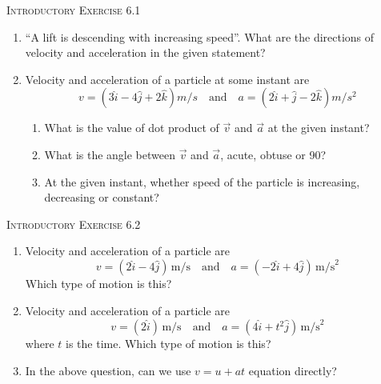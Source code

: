 \documentclass{article}
\begin{document}
\begin{center}
    \textsc{Introductory Exercise 6.1}
\end{center}
\begin{enumerate}
    \item “A lift is descending with increasing speed”. What are the directions of velocity and acceleration in the given statement?
    \item Velocity and acceleration of a particle at some instant are
    \[ v = (3\hat{i} - 4\hat{j} + 2\hat{k}) m/s \quad \text{and} \quad a = (2\hat{i} + \hat{j} - 2\hat{k}) m/s^2 \]
    \begin{enumerate}
        \item What is the value of dot product of $\vec{v}$ and $\vec{a}$ at the given instant?
        \item What is the angle between $\vec{v}$ and $\vec{a}$, acute, obtuse or 90\textdegree?
        \item At the given instant, whether speed of the particle is increasing, decreasing or constant?
    \end{enumerate}
\end{enumerate}

\vspace*{10 mm}
\begin{center}
    \textsc{Introductory Exercise 6.2}
\end{center}
\begin{enumerate}
    \item Velocity and acceleration of a particle are
    \[ v = (2\hat{i} - 4\hat{j}) \, \text{m/s} \quad \text{and} \quad a = (-2\hat{i} + 4\hat{j}) \, \text{m/s}^2 \]
    Which type of motion is this?
    \item Velocity and acceleration of a particle are
    \[ v = (2\hat{i}) \, \text{m/s} \quad \text{and} \quad a = (4\hat{i} + t^2\hat{j}) \, \text{m/s}^2 \]
    where \( t \) is the time. Which type of motion is this?
    \item In the above question, can we use \( v = u + at \) equation directly?
\end{enumerate}
\end{document}
